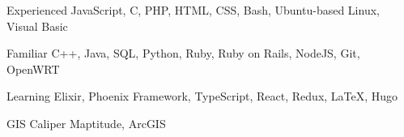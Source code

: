 

\begin{cvskills}

  \cvskill
    {Experienced} %
    {JavaScript, C, PHP, HTML, CSS, Bash, Ubuntu-based Linux, Visual Basic} %

  \cvskill
    {Familiar} %
    {C++, Java, SQL, Python, Ruby, Ruby on Rails, NodeJS, Git, OpenWRT} %
    
  \cvskill
    {Learning} %
    {Elixir, Phoenix Framework, TypeScript, React, Redux, \LaTeX, Hugo} %
    
  \cvskill
    {GIS} %
    {Caliper Maptitude, ArcGIS} %


\end{cvskills}
